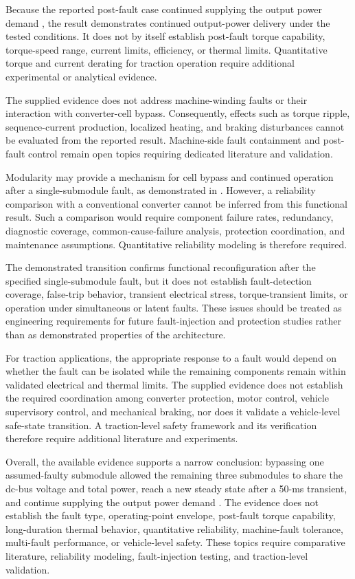Because the reported post-fault case continued supplying the output power demand \cite{Jin2017}, the result demonstrates continued output-power delivery under the tested conditions. It does not by itself establish post-fault torque capability, torque-speed range, current limits, efficiency, or thermal limits. Quantitative torque and current derating for traction operation require additional experimental or analytical evidence. %

The supplied evidence does not address machine-winding faults or their interaction with converter-cell bypass. Consequently, effects such as torque ripple, sequence-current production, localized heating, and braking disturbances cannot be evaluated from the reported result. Machine-side fault containment and post-fault control remain open topics requiring dedicated literature and validation. %

Modularity may provide a mechanism for cell bypass and continued operation after a single-submodule fault, as demonstrated in \cite{Jin2017}. However, a reliability comparison with a conventional converter cannot be inferred from this functional result. Such a comparison would require component failure rates, redundancy, diagnostic coverage, common-cause-failure analysis, protection coordination, and maintenance assumptions. Quantitative reliability modeling is therefore required. %

The demonstrated transition confirms functional reconfiguration after the specified single-submodule fault, but it does not establish fault-detection coverage, false-trip behavior, transient electrical stress, torque-transient limits, or operation under simultaneous or latent faults. These issues should be treated as engineering requirements for future fault-injection and protection studies rather than as demonstrated properties of the architecture. %

For traction applications, the appropriate response to a fault would depend on whether the fault can be isolated while the remaining components remain within validated electrical and thermal limits. The supplied evidence does not establish the required coordination among converter protection, motor control, vehicle supervisory control, and mechanical braking, nor does it validate a vehicle-level safe-state transition. A traction-level safety framework and its verification therefore require additional literature and experiments. %

Overall, the available evidence supports a narrow conclusion: bypassing one assumed-faulty submodule allowed the remaining three submodules to share the dc-bus voltage and total power, reach a new steady state after a 50-ms transient, and continue supplying the output power demand \cite{Jin2017}. The evidence does not establish the fault type, operating-point envelope, post-fault torque capability, long-duration thermal behavior, quantitative reliability, machine-fault tolerance, multi-fault performance, or vehicle-level safety. These topics require comparative literature, reliability modeling, fault-injection testing, and traction-level validation.